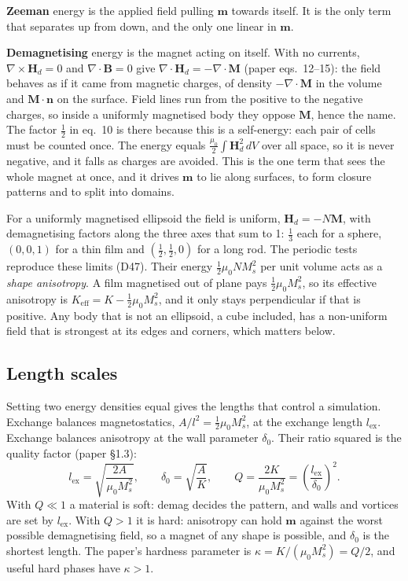 \documentclass[10pt,a4paper]{article}
\newcommand{\mo}{\mu_0}
\newcommand{\vm}{\mathbf{m}}
\newcommand{\vH}{\mathbf{H}}
\newcommand{\dec}[1]{\textcolor{comment}{\small(#1)}}
\begin{document}
\textbf{Zeeman} energy is the applied field pulling $\vm$ towards itself. It is the only term that separates up from
down, and the only one linear in $\vm$.

\textbf{Demagnetising} energy is the magnet acting on itself. With no currents, $\nabla\times\vH_d = 0$ and
$\nabla\cdot\mathbf{B} = 0$ give $\nabla\cdot\vH_d = -\nabla\cdot\mathbf{M}$ (paper eqs.~12--15): the field behaves as
if it came from magnetic charges, of density $-\nabla\cdot\mathbf{M}$ in the volume and $\mathbf{M}\cdot\mathbf{n}$ on
the surface. Field lines run from the positive to the negative charges, so inside a uniformly magnetised body they
oppose $\mathbf{M}$, hence the name. The factor $\frac12$ in eq.~10 is there because this is a self-energy: each pair of
cells must be counted once. The energy equals $\frac{\mo}{2}\int\vH_d^2\,dV$ over all space, so it is never negative,
and it falls as charges are avoided. This is the one term that sees the whole magnet at once, and it drives $\vm$ to
lie along surfaces, to form closure patterns and to split into domains.

For a uniformly magnetised ellipsoid the field is uniform, $\vH_d = -N\mathbf{M}$, with demagnetising factors along the
three axes that sum to 1: $\frac13$ each for a sphere, $(0,0,1)$ for a thin film and $(\frac12,\frac12,0)$ for a long rod.
The periodic tests reproduce these limits \dec{D47}. Their energy $\frac12\mo N M_s^2$ per unit volume acts as a
\emph{shape anisotropy}. A film magnetised out of plane pays $\frac12\mo M_s^2$, so its effective anisotropy is
$K_\mathrm{eff} = K - \frac12\mo M_s^2$, and it only stays perpendicular if that is positive. Any body that is not an
ellipsoid, a cube included, has a non-uniform field that is strongest at its edges and corners, which matters below.

\subsection{Length scales}
Setting two energy densities equal gives the lengths that control a simulation. Exchange balances magnetostatics, $A/l^2
= \frac12\mo M_s^2$, at the exchange length $l_\mathrm{ex}$. Exchange balances anisotropy at the wall parameter
$\delta_0$. Their ratio squared is the quality factor (paper \S1.3):
\[
  l_\mathrm{ex} = \sqrt{\frac{2A}{\mo M_s^2}}, \qquad \delta_0 = \sqrt{\frac{A}{K}}, \qquad
  Q = \frac{2K}{\mo M_s^2} = \left(\frac{l_\mathrm{ex}}{\delta_0}\right)^2.
\]
With $Q\ll 1$ a material is soft: demag decides the pattern, and walls and vortices are set by $l_\mathrm{ex}$. With
$Q>1$ it is hard: anisotropy can hold $\vm$ against the worst possible demagnetising field, so a magnet of any shape is
possible, and $\delta_0$ is the shortest length. The paper's hardness parameter is $\kappa = K/(\mo M_s^2) = Q/2$, and
useful hard phases have $\kappa > 1$.
\end{document}
